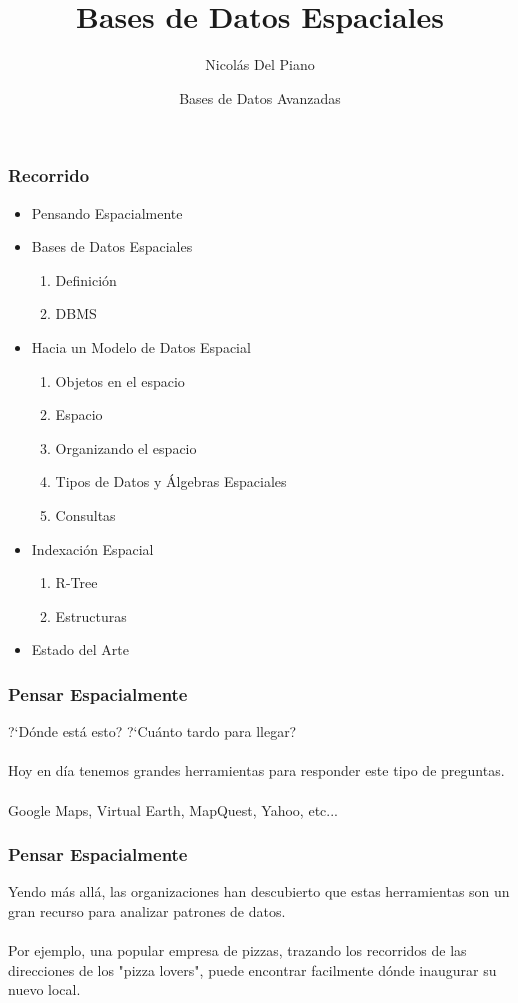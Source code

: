 \documentclass[12pt]{beamer}
\title[Bases de Datos Espaciales] 
{%
  Bases de Datos Espaciales%
}
\author[Del Piano]
{
  Nicol\'as Del Piano
}
\date
{
Bases de Datos Avanzadas
}
\newenvironment{variableblock}[3]{%
  \setbeamercolor{block body}{#2}
  \setbeamercolor{block title}{#3}
  \begin{block}{#1}}{\end{block}}
\begin{document}
\frame{\titlepage}
\begin{frame}
\frametitle{Recorrido}
\begin{itemize}
\item Pensando Espacialmente
\item Bases de Datos Espaciales
\begin{enumerate}
\item Definici\'on
\item DBMS
\end{enumerate}
\item Hacia un Modelo de Datos Espacial
\begin{enumerate}
\item Objetos en el espacio
\item Espacio
\item Organizando el espacio
\item Tipos de Datos y \'Algebras Espaciales
\item Consultas
\end{enumerate}
\item Indexaci\'on Espacial
\begin{enumerate}
\item R-Tree
\item Estructuras
\end{enumerate}
\item Estado del Arte
\end{itemize}
\end{frame}
\begin{frame}
\frametitle{Pensar Espacialmente}
?`D\'onde est\'a esto? ?`Cu\'anto tardo para llegar?\\
\ \\
Hoy en d\'ia tenemos grandes herramientas para responder este tipo de preguntas.\\
\ \\
Google Maps, Virtual Earth, MapQuest, Yahoo, etc...
\end{frame}

\begin{frame}
\frametitle{Pensar Espacialmente}
Yendo m\'as all\'a, las organizaciones han descubierto que estas herramientas son un gran recurso para analizar patrones de datos.\\
\ \\
Por ejemplo, una popular empresa de pizzas, trazando los recorridos de las direcciones de los "pizza lovers", puede encontrar facilmente d\'onde inaugurar su nuevo local.
\end{frame}
\end{document}
